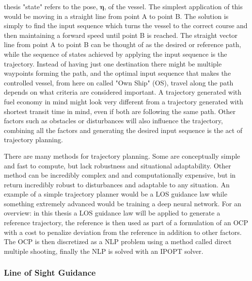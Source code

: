 thesis "state" refers to the pose, $\bm{\eta}$, of the vessel. The simplest application of this would be moving in a straight line from point A to point B.
The solution is simply to find the input sequence which turns the vessel to the correct course and then maintaining a forward speed until point B is reached.
The straight vector line from point A to point B can be thought of as the desired or reference path, while the sequence of states achieved by applying the 
input sequence is the trajectory. Instead of having just one destination there might be multiple waypoints forming the path, and the optimal
input sequence that makes the controlled vessel, from here on called "Own Ship" (OS), travel along the path depends on what criteria are considered important. A trajectory generated with fuel
economy in mind might look very different from a trajectory generated with shortest transit time in mind, even if both are following the same path.
Other factors such as obstacles or disturbances will also influence the trajectory, combining all the factors and generating the desired
input sequence is the act of trajectory planning.

There are many methods for trajectory planning. Some are conceptually simple and fast to compute, but lack robustness and situational adaptability.
Other method can be incredibly complex and and computationally expensive, but in return incredibly robust to disturbances and adaptable to
any situation. An example of a simple trajectory planner would be a \gls{LOS} guidance law while something extremely advanced would be training a deep
neural network. For an overview: in this thesis a \gls{LOS} guidance law will be applied to generate a reference trajectory, the reference is then used as part of a
formulation of an \gls{OCP} with a cost to penalize deviation from the reference in addition to other factors. The \gls{OCP} is then discretized
as a \gls{NLP} problem using a method called direct multiple shooting, finally the \gls{NLP} is solved with an \gls{IPOPT} solver.

\subsubsection*{Line of Sight Guidance} \label{CHAP: LOS GUIDANCE} %

